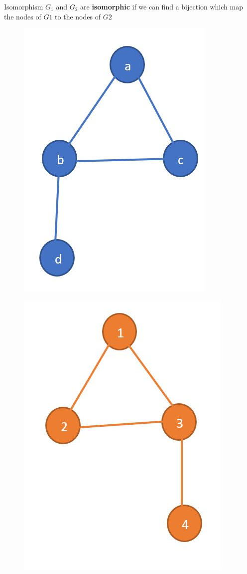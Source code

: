 \documentclass[15pt]{beamer}
\begin{document}
\begin{frame}{Isomorphism}%
    $G_1$ and $G_2$ are \textbf{isomorphic} if we can find a bijection which map the nodes of $G1$ to the nodes of $G2$ 
    
	\begin{minipage}{0.5\linewidth}
		\begin{figure}
			\centering
			\includegraphics[width=0.7\linewidth]{img/graph1iso.jpg}
		\end{figure}			
	\end{minipage}			   
	\begin{minipage}{0.49\linewidth}
		\begin{figure}
			\centering
			\includegraphics[width=0.7\linewidth]{img/graph2iso.jpg}
		\end{figure}			
	\end{minipage}
	

\end{frame}
\end{document}
